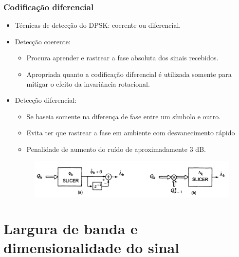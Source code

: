 \begin{frame}
	\frametitle{Codificação diferencial}

	\begin{itemize}	   
	    \item Técnicas de detecção do DPSK: coerente ou diferencial.
	    \item Detecção coerente:
	    \begin{itemize}
	      \item Procura aprender e rastrear a fase absoluta dos sinais recebidos.
	      \item Apropriada quanto a codificação diferencial é utilizada somente para mitigar o efeito da invariância rotacional.
	    \end{itemize}
	    \item Detecção diferencial:
	    \begin{itemize}
	      \item Se baseia somente na diferença de fase entre um símbolo e outro.
	      \item Evita ter que rastrear a fase em ambiente com desvanecimento rápido
	      \item Penalidade de aumento do ruído de aproximadamente 3 dB.
	    \end{itemize}

	    \begin{figure}[t]	
		\begin{center}
		\includegraphics[width=0.8\columnwidth]{figs/adv_28}
		\end{center}
	    \end{figure}
	\end{itemize}	 
\end{frame}

\section{Largura de banda e dimensionalidade do sinal}

